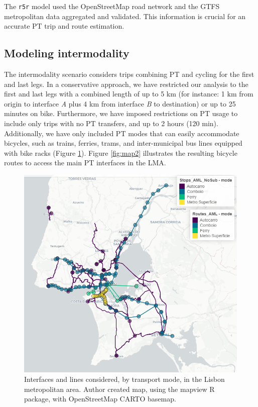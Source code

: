\documentclass[runningheads]{llncs}
\begin{document}
The \texttt{r5r} model used the OpenStreetMap road network and the GTFS
metropolitan data aggregated and validated. This information is crucial
for an accurate PT trip and route estimation.

\subsection{Modeling intermodality}\label{modeling-intermodality}

The intermodality scenario considers trips combining PT and cycling for
the first and last legs. In a conservative approach, we have restricted
our analysis to the first and last legs with a combined length of up to
5 km (for instance: 1 km from origin to interface \emph{A} plus 4 km
from interface \emph{B} to destination) or up to 25 minutes on bike.
Furthermore, we have imposed restrictions on PT usage to include only
trips with no PT transfers, and up to 2 hours (120 min). Additionally,
we have only included PT modes that can easily accommodate bicycles,
such as trains, ferries, trams, and inter-municipal bus lines equipped
with bike racks (Figure \ref{fig:map1}). Figure \ref{fig:map2}
illustrates the resulting bicycle routes to access the main PT
interfaces in the LMA.

\begin{figure}[h]

{\centering \includegraphics[width=0.6\linewidth,]{img/map1} 

}

\caption{Interfaces and lines considered, by transport mode, in the Lisbon metropolitan area. Author created map, using the mapview R package, with OpenStreetMap CARTO basemap.}\label{fig:map1}
\end{figure}
\end{document}
